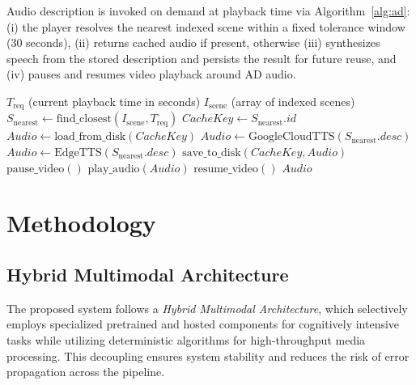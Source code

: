 \documentclass[conference]{IEEEtran}
\begin{document}
Audio description is invoked on demand at playback time via Algorithm~\ref{alg:ad}: (i) the player resolves the nearest indexed scene within a fixed tolerance window (30 seconds), (ii) returns cached audio if present, otherwise (iii) synthesizes speech from the stored description and persists the result for future reuse, and (iv) pauses and resumes video playback around AD audio.

\begin{algorithm}[!t]
\caption{On-Demand Audio Description Resolution}
\label{alg:ad}
\begin{algorithmic}[1]
\Require $T_{\text{req}}$ (current playback time in seconds)
\Require $I_{\text{scene}}$ (array of indexed scenes)
\State $S_{\text{nearest}} \gets \text{find\_closest}(I_{\text{scene}}, T_{\text{req}})$
    \State \Return {}
\EndIf
\State $CacheKey \gets S_{\text{nearest}}.id$
    \State $Audio \gets \text{load\_from\_disk}(CacheKey)$
\Else
        \State $Audio \gets \text{GoogleCloudTTS}(S_{\text{nearest}}.desc)$
    \Else
        \State $Audio \gets \text{EdgeTTS}(S_{\text{nearest}}.desc)$
    \EndIf
    \State $\text{save\_to\_disk}(CacheKey, Audio)$
\EndIf
\State $\text{pause\_video}()$
\State $\text{play\_audio}(Audio)$
\State $\text{resume\_video}()$
\State \Return $Audio$
\end{algorithmic}
\end{algorithm}

\section{Methodology}
\subsection{Hybrid Multimodal Architecture}
The proposed system follows a \emph{Hybrid Multimodal Architecture}, which selectively employs specialized pretrained and hosted components for cognitively intensive tasks while utilizing deterministic algorithms for high-throughput media processing. This decoupling ensures system stability and reduces the risk of error propagation across the pipeline.
\end{document}
